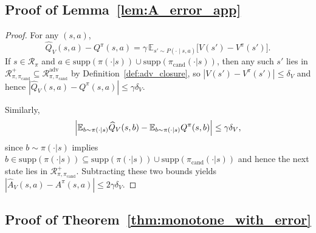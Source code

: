\documentclass{article}
\theoremstyle{plain}
\theoremstyle{definition}
\theoremstyle{remark}
\newcommand{\E}{\mathbb{E}}
\begin{document}
\subsection{Proof of Lemma~\ref{lem:A_error_app}}

\begin{proof}
For any $(s,a)$,
\[
\widehat Q_V(s,a) - Q^\pi(s,a)
=
\gamma\,\E_{s'\sim P(\cdot\mid s,a)}\bigl[V(s')-V^\pi(s')\bigr].
\]
If $s\in\mathcal{R}_\pi$ and $a\in \mathrm{supp}(\pi(\cdot|s))\cup\mathrm{supp}(\pi_{\mathrm{cand}}(\cdot|s))$, then any such $s'$ lies in $\mathcal{R}_{\pi,\pi_{\mathrm{cand}}}^{+}\subseteq \mathcal{R}_{\pi,\pi_{\mathrm{cand}}}^{\mathrm{adv}}$ by Definition~\ref{def:adv_closure},
so $|V(s')-V^\pi(s')|\le \delta_V$ and hence
$|\widehat Q_V(s,a)-Q^\pi(s,a)|\le \gamma\delta_V$.

Similarly,
\[
\Bigl|\E_{b\sim\pi(\cdot\mid s)}\widehat Q_V(s,b)-\E_{b\sim\pi(\cdot\mid s)}Q^\pi(s,b)\Bigr|
\le \gamma\delta_V,
\]
since $b\sim\pi(\cdot|s)$ implies $b\in \mathrm{supp}(\pi(\cdot|s))\subseteq \mathrm{supp}(\pi(\cdot|s))\cup\mathrm{supp}(\pi_{\mathrm{cand}}(\cdot|s))$ and hence the next state lies in $\mathcal{R}_{\pi,\pi_{\mathrm{cand}}}^{+}$.
Subtracting these two bounds yields
$|\widehat A_V(s,a)-A^\pi(s,a)|\le 2\gamma\delta_V$.
\end{proof}

\subsection{Proof of Theorem~\ref{thm:monotone_with_error}}
\end{document}
